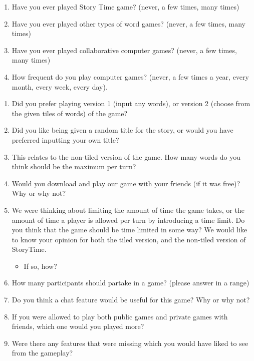 \documentclass{sigchi}
\begin{document}
\label{apx:demographic}

\begin{enumerate}
\item Have you ever played Story Time game? (never, a few times, many times)

\item Have you ever played other types of word games? (never, a few times, many times)

\item Have you ever played collaborative computer games? (never, a few times, many times)

\item How frequent do you play computer games? (never, a few times a year, every month, every week, every day).

\end{enumerate}



\label{apx:interview}

\begin{enumerate}
\item Did you prefer playing version 1 (input any words), or version 2 (choose from the given 
tiles of words) of the game? 

\item Did you like being given a random title for the story, or would you have preferred
inputting your own title?

\item This relates to the non-tiled version of the game. How many words do you think should 
be the maximum per turn?

\item Would you download and play our game with your friends (if it was free)? Why or why 
not?

\item We were thinking about limiting the amount of time the game takes, or the amount of 
time a player is allowed per turn by introducing a time limit. Do you think that the game 
should be time limited in some way? We would like to know your opinion for both the 
tiled version, and the non-tiled version of StoryTime.
\begin{itemize}
\item If so, how?
\end{itemize}

\item How many participants should partake in a game? (please answer in a range)

\item Do you think a chat feature would be useful for this game? Why or why not?

\item If you were allowed to play both public games and private games with friends, which one would you played more?

\item Were there any features that were missing which you would have liked to see from the 
gameplay?
\end{enumerate}
\end{document}
